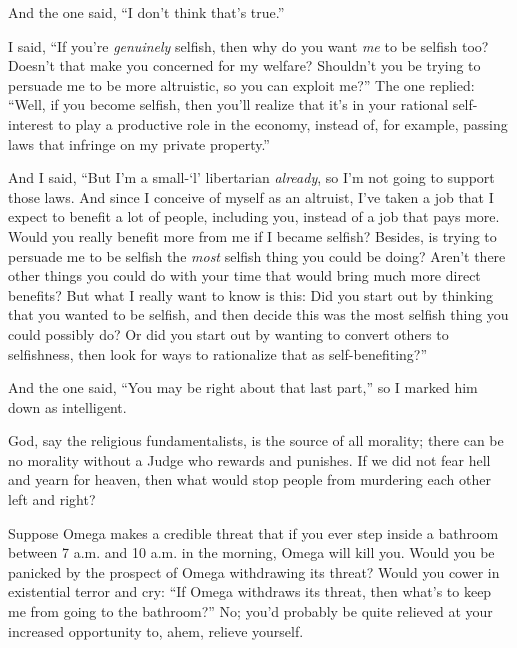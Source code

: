 {
 And the one said, ``I don't think
that's true.''}

{
 I said, ``If you're
\textit{genuinely} selfish, then why do you want \textit{me} to be
selfish too? Doesn't that make you concerned for my
welfare? Shouldn't you be trying to persuade me to be
more altruistic, so you can exploit me?'' The one
replied: ``Well, if you become selfish, then
you'll realize that it's in your
rational self-interest to play a productive role in the economy,
instead of, for example, passing laws that infringe on my private
property.''}

{
 And I said, ``But I'm a
small-`l' libertarian \textit{already},
so I'm not going to support those laws. And since I
conceive of myself as an altruist, I've taken a job
that I expect to benefit a lot of people, including you, instead of a
job that pays more. Would you really benefit more from me if I became
selfish? Besides, is trying to persuade me to be selfish the
\textit{most} selfish thing you could be doing? Aren't
there other things you could do with your time that would bring much
more direct benefits? But what I really want to know is this: Did you
start out by thinking that you wanted to be selfish, and then decide
this was the most selfish thing you could possibly do? Or did you start
out by wanting to convert others to selfishness, then look for ways to
rationalize that as self-benefiting?''}

{
 And the one said, ``You may be right about that
last part,'' so I marked him down as intelligent.}

\myendsectiontext


\bigskip


{
 God, say the religious fundamentalists, is the source of all
morality; there can be no morality without a Judge who rewards and
punishes. If we did not fear hell and yearn for heaven, then what would
stop people from murdering each other left and right? }

{
 Suppose Omega makes a credible threat that if you ever step inside
a bathroom between 7 a.m. and 10 a.m. in the morning, Omega will kill
you. Would you be panicked by the prospect of Omega withdrawing its
threat? Would you cower in existential terror and cry:
``If Omega withdraws its threat, then
what's to keep me from going to the
bathroom?'' No; you'd probably be
quite relieved at your increased opportunity to, ahem, relieve
yourself.}

